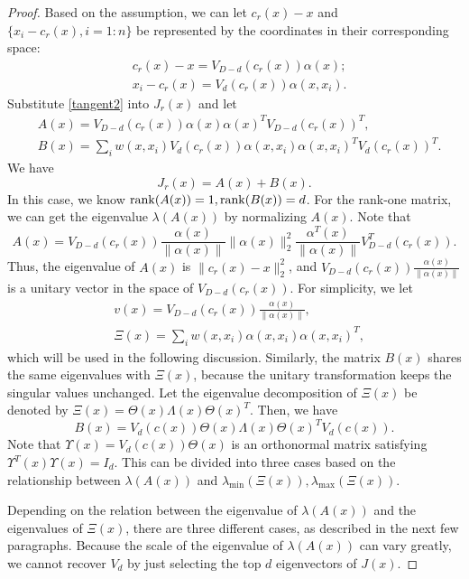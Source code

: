 \documentclass[aos,preprint]{imsart}
\theoremstyle{remark}
\begin{document}
\begin{appendix}
\begin{proof}
Based on the assumption, we can let $c_r(x)-x$ and $\{x_i-c_r(x), i=1:n\}$ be represented by the coordinates in their corresponding space:
\begin{equation} \label{tangent2}
\begin{aligned}
&c_r(x) - x =  V_{D-d}(c_r(x)) \alpha(x); \\
&x_i-c_r(x) = V_d(c_r(x))\alpha(x, x_i).
\end{aligned}
\end{equation}
Substitute \eqref{tangent2} into $J_r(x)$ and let
\begin{align*}
&A(x)= V_{D-d}(c_r(x)) \alpha(x) \alpha(x)^T V_{D-d}(c_r(x))^T,\\
&B(x)=\sum_i w(x, x_i) V_d(c_r(x)) \alpha(x, x_i)\alpha(x, x_i)^T V_d(c_r(x))^T.
\end{align*}
We have
\[
J_r(x) =A(x) + B(x).
\]
In this case, we know ${\rm rank}(A(x))=1, {\rm rank} (B(x))=d$. For the rank-one matrix, we can get the eigenvalue  $\lambda(A(x))$ by normalizing $A(x)$. Note that
\[
A(x) = V_{D-d}(c_r(x))\frac{\alpha(x)}{\|\alpha(x)\|}  \|\alpha(x)\|_2^2 \frac{\alpha^T(x)}{\|\alpha(x)\|}  V^T_{D-d}(c_r(x)).
\]
Thus, the eigenvalue of $A(x)$ is $\|c_r(x)-x\|_2^2$, and $V_{D-d}(c_r(x))\frac{\alpha(x)}{\|\alpha(x)\|}$ is a unitary vector in the space of $V_{D-d}(c_r(x))$. For simplicity, we let
\[
\begin{aligned}
&v(x) = V_{D-d}(c_r(x))\frac{\alpha(x)}{\|\alpha(x)\|},\\
&\Xi (x) = \sum_i w(x, x_i) \alpha(x, x_i)\alpha(x, x_i)^T,
\end{aligned}
\]
which will be used in the following discussion.
Similarly, the matrix $B(x)$ shares the same eigenvalues  with $\Xi (x)$, because the unitary transformation keeps the singular values unchanged. 
Let the eigenvalue decomposition of $\Xi (x)$ be denoted by $\Xi(x) = \Theta(x) \Lambda(x) \Theta(x)^T$. Then, we have
\[
B(x) = V_d(c(x))\Theta(x) \Lambda(x)\Theta(x)^T V_d(c(x)).
\]
Note that $\Upsilon(x) = V_d(c(x))\Theta(x)$ is an orthonormal matrix satisfying 
$\Upsilon^T (x)\Upsilon(x)=I_d$. This can be divided into three cases based on the relationship between $\lambda(A(x))$ and $\lambda_{\min}(\Xi(x)), \lambda_{\max}(\Xi(x))$.

Depending on the relation between the eigenvalue of $\lambda(A(x))$ and the eigenvalues of $\Xi(x)$, there are three different cases, as described in the next few paragraphs. Because the scale of the eigenvalue of $\lambda(A(x))$ can vary greatly, we cannot recover $V_d$ by just selecting the top $d$ eigenvectors of $J(x)$.


\end{proof}
\end{appendix}
\end{document}

